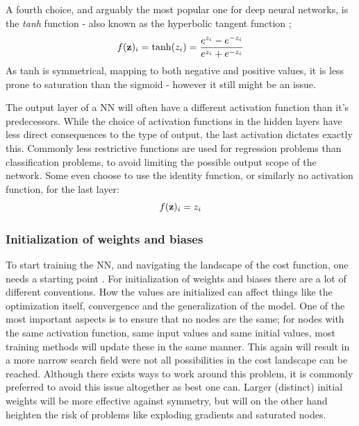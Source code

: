 A fourth choice, and arguably the most popular one for deep neural networks, is the \textit{tanh} function - also known as the hyperbolic tangent function \citep[Neural Networks]{morten};
\begin{equation}
    f(\bold{z})_i = \tanh(z_i)=\frac{e^{z_i}-e^{-z_i}}{e^{z_i}+e^{-z_i}}
\end{equation}
As tanh is symmetrical, mapping to both negative and positive values, it is less prone to saturation than the sigmoid - however it still might be an issue. 

The output layer of a NN will often have a different activation function than it's predecessors. While the choice of activation functions in the hidden layers have less direct consequences to the type of output, the last activation dictates exactly this.
Commonly less restrictive functions are used for regression problems than classification problems, to avoid limiting the possible output scope of the network. Some even choose to use the identity function, or similarly no activation function, for the last layer:
\begin{equation}
    f(\bold{z})_i=z_i
\end{equation}

\subsubsection{Initialization of weights and biases}\label{sec:NN_init}

To start training the NN, and navigating the landscape of the cost function, one needs a starting point \citep[p.297]{Goodfellow-et-al-2016}. For initialization of weights and biases there are a lot of different conventions. How the values are initialized can affect things like the optimization itself, convergence and the generalization of the model. 
One of the most important aspects is to ensure that no nodes are the same; for nodes with the same activation function, same input values and same initial values, most training methods will update these in the same manner. This again will result in a more narrow search field were not all possibilities in the cost landscape can be reached. Although there exists ways to work around this problem, it is commonly preferred to avoid this issue altogether as best one can. 
Larger (distinct) initial weights will be more effective against symmetry, but will on the other hand heighten the risk of problems like exploding gradients and saturated nodes. 

